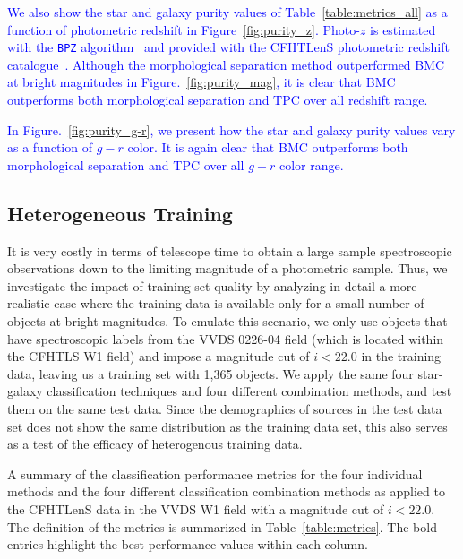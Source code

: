 \documentclass[useAMS,usenatbib]{mn2e}
\begin{document}
\textcolor{blue}{We also show the star and galaxy purity values
of Table~\ref{table:metrics_all} as a function of
photometric redshift in Figure~\ref{fig:purity_z}.
Photo-$z$ is estimated with
the \texttt{BPZ} algorithm~\citep{benitez2000bayesian}
and provided with
the CFHTLenS photometric redshift catalogue~\citep{Hildebrandt2012}.
Although the morphological separation method outperformed BMC
at bright magnitudes in Figure.~\ref{fig:purity_mag},
it is clear that BMC outperforms
both morphological separation and TPC over all redshift range.}

\textcolor{blue}{In Figure.~\ref{fig:purity_g-r},
we present how the star and galaxy purity values vary
as a function of $g-r$ color.
It is again clear that BMC outperforms
both morphological separation and TPC over all $g-r$ color range.  }


\subsection{Heterogeneous Training}
  \label{section:poor_training}
 
It is very costly in terms of telescope time to
obtain a large sample spectroscopic observations
down to the limiting magnitude of a photometric sample.
Thus, we investigate the impact of training set quality
by analyzing in detail a more realistic case
where the training data is available
only for a small number of objects at bright magnitudes.
To emulate this scenario,
we only use objects that have spectroscopic labels
from the VVDS 0226-04 field (which is located within the CFHTLS W1 field)
and impose a magnitude cut of $i < 22.0$ in the training data,
leaving us a training set with 1,365 objects.
We apply the same four star-galaxy classification techniques
and four different combination methods,
and test them on the same test data.
Since the demographics of sources in the test data set
does not show the same distribution as the training data set,
this also serves as a test of the efficacy of heterogenous training data. 

\begin{table}
  \caption{A summary of the classification performance metrics
           for the four individual methods
           and the four different classification combination methods
           as applied to the CFHTLenS data in the VVDS W1 field
           with a magnitude cut of $i < 22.0$.
           The definition of the metrics is summarized in
           Table~\ref{table:metrics}.
           The bold entries highlight the best performance values
           within each column.}
  \centering
  
  \label{table:metrics_cut}
\end{table}
\end{document}

